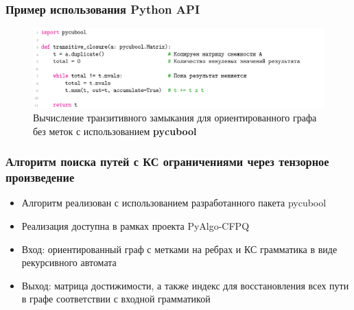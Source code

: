 \documentclass[xcolor=table,english]{beamer}
\begin{document}
\begin{frame}[fragile] \frametitle{Пример использования Python API}
    \begin{center}
     \begin{minipage}[m]{0.915\linewidth}
        \begin{figure}
            \centering
            \includegraphics[width=\textwidth]{figures/tc_python_api.png}
            \caption{Вычисление транзитивного замыкания для ориентированного графа без меток с использованием \textbf{pycubool}}
        \end{figure}
    \end{minipage}\hfill   
    \end{center}
\end{frame}

\begin{frame}[fragile] \frametitle{Алгоритм поиска путей с КС ограничениями через тензорное произведение}
    \begin{itemize}
        \item Алгоритм реализован с использованием разработанного пакета pycubool
        \item Реализация доступна в рамках проекта PyAlgo-CFPQ
        \item Вход: ориентированный граф с метками на ребрах и КС грамматика в виде рекурсивного автомата
        \item Выход: матрица достижимости, а также индекс для восстановления всех пути в графе соответствии с входной грамматикой
    \end{itemize}
\end{frame}
\end{document}
